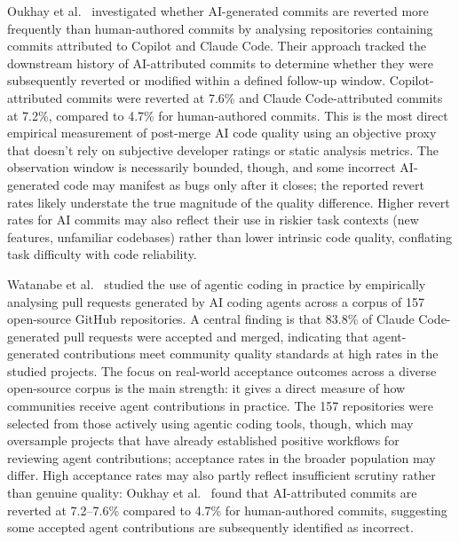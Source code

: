 Oukhay et al.~\cite{oukhay2026} investigated whether AI-generated commits are
reverted more frequently than human-authored commits by analysing repositories
containing commits attributed to Copilot and Claude Code. Their approach tracked
the downstream history of AI-attributed commits to determine whether they were
subsequently reverted or modified within a defined follow-up window.
Copilot-attributed commits were reverted at 7.6\% and Claude Code-attributed commits
at 7.2\%, compared to 4.7\% for human-authored commits. This is the most direct
empirical measurement of post-merge AI code quality using an objective proxy that
doesn't rely on subjective developer ratings or static analysis metrics. The
observation window is necessarily bounded, though, and some incorrect AI-generated
code may manifest as bugs only after it closes; the reported revert rates likely
understate the true magnitude of the quality difference. Higher revert rates for AI
commits may also reflect their use in riskier task contexts (new features, unfamiliar
codebases) rather than lower intrinsic code quality, conflating task difficulty with
code reliability.

Watanabe et al.~\cite{watanabe2025} studied the use of agentic coding in practice
by empirically analysing pull requests generated by AI coding agents across a corpus
of 157 open-source GitHub repositories. A central finding is that 83.8\% of
Claude Code-generated pull requests were accepted and merged, indicating that
agent-generated contributions meet community quality standards at high rates in
the studied projects. The focus on real-world acceptance outcomes across a diverse
open-source corpus is the main strength: it gives a direct measure of how communities
receive agent contributions in practice. The 157 repositories were selected from
those actively using agentic coding tools, though, which may oversample projects
that have already established positive workflows for reviewing agent contributions;
acceptance rates in the broader population may differ. High acceptance rates may
also partly reflect insufficient scrutiny rather than genuine quality: Oukhay et
al.~\cite{oukhay2026} found that AI-attributed commits are reverted at 7.2--7.6\%
compared to 4.7\% for human-authored commits, suggesting some accepted agent
contributions are subsequently identified as incorrect.

